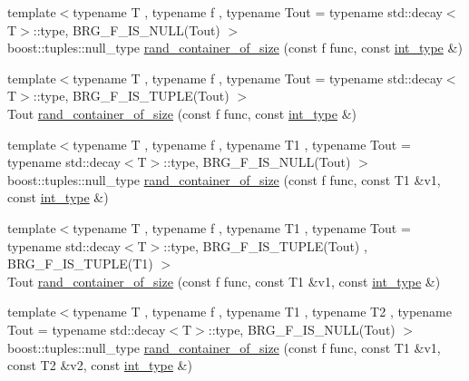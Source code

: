 \begin{DoxyCompactItemize}
{\footnotesize template$<$typename T , typename f , typename Tout  = typename std\+::decay$<$\+T$>$\+::type, B\+R\+G\+\_\+\+F\+\_\+\+I\+S\+\_\+\+N\+U\+L\+L(\+Tout) $>$ }\\boost\+::tuples\+::null\+\_\+type \hyperlink{namespaceIceBRG_a6e3514f6f2b204827bd19d46818fe71a}{rand\+\_\+container\+\_\+of\+\_\+size} (const f func, const \hyperlink{lib_2IceBRG__main_2common_8h_ac4de9d9335536ac22821171deec8d39e}{int\+\_\+type} \&)
\item 
{\footnotesize template$<$typename T , typename f , typename Tout  = typename std\+::decay$<$\+T$>$\+::type, B\+R\+G\+\_\+\+F\+\_\+\+I\+S\+\_\+\+T\+U\+P\+L\+E(\+Tout) $>$ }\\Tout \hyperlink{namespaceIceBRG_a36220fb059d97255a863e2ddb0af3a4c}{rand\+\_\+container\+\_\+of\+\_\+size} (const f func, const \hyperlink{lib_2IceBRG__main_2common_8h_ac4de9d9335536ac22821171deec8d39e}{int\+\_\+type} \&)
\item 
{\footnotesize template$<$typename T , typename f , typename T1 , typename Tout  = typename std\+::decay$<$\+T$>$\+::type, B\+R\+G\+\_\+\+F\+\_\+\+I\+S\+\_\+\+N\+U\+L\+L(\+Tout) $>$ }\\boost\+::tuples\+::null\+\_\+type \hyperlink{namespaceIceBRG_acccaf0bfcc0f9e751010c99143a114b0}{rand\+\_\+container\+\_\+of\+\_\+size} (const f func, const T1 \&v1, const \hyperlink{lib_2IceBRG__main_2common_8h_ac4de9d9335536ac22821171deec8d39e}{int\+\_\+type} \&)
\item 
{\footnotesize template$<$typename T , typename f , typename T1 , typename Tout  = typename std\+::decay$<$\+T$>$\+::type, B\+R\+G\+\_\+\+F\+\_\+\+I\+S\+\_\+\+T\+U\+P\+L\+E(\+Tout) , B\+R\+G\+\_\+\+F\+\_\+\+I\+S\+\_\+\+T\+U\+P\+L\+E(\+T1) $>$ }\\Tout \hyperlink{namespaceIceBRG_ab9909381a61dbdafd69115b03725733c}{rand\+\_\+container\+\_\+of\+\_\+size} (const f func, const T1 \&v1, const \hyperlink{lib_2IceBRG__main_2common_8h_ac4de9d9335536ac22821171deec8d39e}{int\+\_\+type} \&)
\item 
{\footnotesize template$<$typename T , typename f , typename T1 , typename T2 , typename Tout  = typename std\+::decay$<$\+T$>$\+::type, B\+R\+G\+\_\+\+F\+\_\+\+I\+S\+\_\+\+N\+U\+L\+L(\+Tout) $>$ }\\boost\+::tuples\+::null\+\_\+type \hyperlink{namespaceIceBRG_a46ee3c23c4b6da22dbe9b89f77cb7639}{rand\+\_\+container\+\_\+of\+\_\+size} (const f func, const T1 \&v1, const T2 \&v2, const \hyperlink{lib_2IceBRG__main_2common_8h_ac4de9d9335536ac22821171deec8d39e}{int\+\_\+type} \&)

\end{DoxyCompactItemize}
